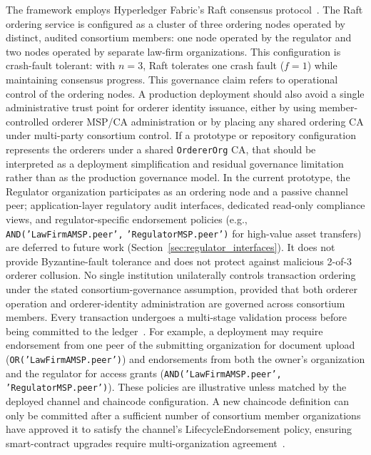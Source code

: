 \documentclass{ieeeaccess}
\begin{document}
The framework employs Hyperledger Fabric's Raft consensus
protocol~\cite{Ongaro2014,hyperledgerFabricOrderingService_v24}.
The Raft ordering service is configured as a cluster of three ordering nodes
operated by distinct, audited consortium members: one node operated by the
regulator and two nodes operated by separate law-firm organizations. This
configuration is crash-fault tolerant: with $n=3$, Raft tolerates one crash
fault ($f=1$) while maintaining consensus progress. This governance claim
refers to operational control of the ordering nodes. A production deployment
should also avoid a single administrative trust point for orderer identity
issuance, either by using member-controlled orderer MSP/CA administration or
by placing any shared ordering CA under multi-party consortium control. If a prototype or repository configuration represents the orderers under a shared
\texttt{OrdererOrg} CA, that should be interpreted as a deployment
simplification and residual governance limitation rather than as the
production governance model. In the current prototype, the Regulator organization participates as an ordering node and a passive channel peer; application-layer regulatory audit interfaces, dedicated read-only compliance views, and regulator-specific endorsement
policies (e.g., \texttt{AND(}\allowbreak\texttt{'LawFirmAMSP.peer',}\allowbreak
\texttt{'RegulatorMSP.peer')} for high-value asset transfers) are deferred to future work (Section~\ref{sec:regulator_interfaces}). It does not provide Byzantine-fault tolerance and
does not protect against malicious 2-of-3 orderer collusion. No single institution unilaterally controls transaction ordering under
the stated consortium-governance assumption, provided that both orderer
operation and orderer-identity administration are governed across consortium
members.
Every transaction undergoes a multi-stage validation process before
being committed to the
ledger~\cite{androulaki2018hyperledger,fabricEndorsementDoc}. For
example, a deployment may require endorsement from one peer of the
submitting organization for document upload
(\texttt{OR('LawFirmAMSP.peer')}) and endorsements from both the
owner's organization and the regulator for access grants
(\texttt{AND('LawFirmAMSP.peer', 'RegulatorMSP.peer')}). These
policies are illustrative unless matched by the deployed channel and
chaincode configuration. A new chaincode definition can only be
committed after a sufficient number of consortium member organizations
have approved it to satisfy the channel's LifecycleEndorsement policy,
ensuring smart-contract upgrades require multi-organization
agreement~\cite{fabricChaincodeLifecycleDoc}.
\newpage
\end{document}
